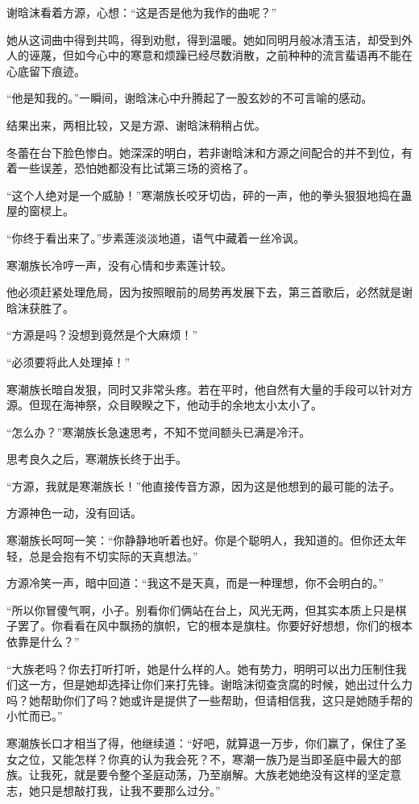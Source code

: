 \begin{this_body}
谢晗沫看着方源，心想：“这是否是他为我作的曲呢？”

她从这词曲中得到共鸣，得到劝慰，得到温暖。她如同明月般冰清玉洁，却受到外人的诬蔑，但如今心中的寒意和烦躁已经尽数消散，之前种种的流言蜚语再不能在心底留下痕迹。

“他是知我的。”一瞬间，谢晗沫心中升腾起了一股玄妙的不可言喻的感动。

结果出来，两相比较，又是方源、谢晗沫稍稍占优。

冬蕾在台下脸色惨白。她深深的明白，若非谢晗沫和方源之间配合的并不到位，有着一些误差，恐怕她都没有比试第三场的资格了。

“这个人绝对是一个威胁！”寒潮族长咬牙切齿，砰的一声，他的拳头狠狠地捣在蛊屋的窗棂上。

“你终于看出来了。”步素莲淡淡地道，语气中藏着一丝冷讽。

寒潮族长冷哼一声，没有心情和步素莲计较。

他必须赶紧处理危局，因为按照眼前的局势再发展下去，第三首歌后，必然就是谢晗沫获胜了。

“方源是吗？没想到竟然是个大麻烦！”

“必须要将此人处理掉！”

寒潮族长暗自发狠，同时又非常头疼。若在平时，他自然有大量的手段可以针对方源。但现在海神祭，众目睽睽之下，他动手的余地太小太小了。

“怎么办？”寒潮族长急速思考，不知不觉间额头已满是冷汗。

思考良久之后，寒潮族长终于出手。

“方源，我就是寒潮族长！”他直接传音方源，因为这是他想到的最可能的法子。

方源神色一动，没有回话。

寒潮族长呵呵一笑：“你静静地听着也好。你是个聪明人，我知道的。但你还太年轻，总是会抱有不切实际的天真想法。”

方源冷笑一声，暗中回道：“我这不是天真，而是一种理想，你不会明白的。”

“所以你冒傻气啊，小子。别看你们俩站在台上，风光无两，但其实本质上只是棋子罢了。你看看在风中飘扬的旗帜，它的根本是旗柱。你要好好想想，你们的根本依靠是什么？”

“大族老吗？你去打听打听，她是什么样的人。她有势力，明明可以出力压制住我们这一方，但是她却选择让你们来打先锋。谢晗沫彻查贪腐的时候，她出过什么力吗？她帮助你们了吗？她或许是提供了一些帮助，但请相信我，这只是她随手帮的小忙而已。”

寒潮族长口才相当了得，他继续道：“好吧，就算退一万步，你们赢了，保住了圣女之位，又能怎样？你真的认为我会死？不，寒潮一族乃是当即圣庭中最大的部族。让我死，就是要令整个圣庭动荡，乃至崩解。大族老她绝没有这样的坚定意志，她只是想敲打我，让我不要那么过分。”


\end{this_body}
